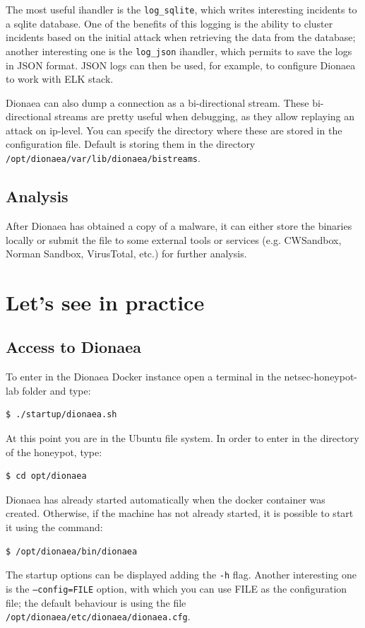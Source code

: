 \documentclass[epsfig,a4paper,11pt,titlepage,oneside,openany]{book}
\begin{document}
The most useful ihandler is the \texttt{log\_sqlite}, which writes interesting incidents to a sqlite database. One of the benefits of this logging is the ability to cluster incidents based on the initial attack when retrieving the data from the database; another interesting one is the \texttt{log\_json} ihandler, which permits to save the logs in JSON format. JSON logs can then be used, for example, to configure Dionaea to work with ELK stack.

Dionaea can also dump a connection as a bi-directional stream. These bi-directional streams are pretty useful when debugging, as they allow replaying an attack on ip-level. You can specify the directory where these are stored in the configuration file. Default is storing them in the directory \texttt{/opt/dionaea/var/lib/dionaea/bistreams}.

\subsection{Analysis}

After Dionaea has obtained a copy of a malware, it can either store the binaries locally or submit the file to some external tools or services (e.g. CWSandbox, Norman Sandbox, VirusTotal, etc.) for further analysis.

\section{Let's see in practice}

\subsection{Access to Dionaea}


To enter in the Dionaea Docker instance open a terminal in the netsec-honeypot-lab folder and type:

\begin{lstlisting}[language=bash]
$ ./startup/dionaea.sh
\end{lstlisting}

\noindent At this point you are in the Ubuntu file system. In order to enter in the directory of the honeypot, type:
\begin{lstlisting}[language=bash]
$ cd opt/dionaea
\end{lstlisting}

\noindent Dionaea has already started automatically when the docker container was created. Otherwise, if the machine has not already started, it is possible to start it using the command:
\begin{lstlisting}[language=bash]
$ /opt/dionaea/bin/dionaea
\end{lstlisting}
The startup options can be displayed adding the \texttt{-h} flag. Another interesting one is the \texttt{--config=FILE} option, with which you can use FILE as the configuration file; the default behaviour is using the file \texttt{/opt/dionaea/etc/dionaea/dionaea.cfg}.
\end{document}
